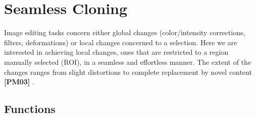 \hypertarget{group__photo__clone}{}\section{Seamless Cloning}
\label{group__photo__clone}


Image editing tasks concern either global changes (color/intensity corrections, filters, deformations) or local changes concerned to a selection. Here we are interested in achieving local changes, ones that are restricted to a region manually selected (R\+OI), in a seamless and effortless manner. The extent of the changes ranges from slight distortions to complete replacement by novel content {\bfseries [P\+M03]} .  


\subsection*{Functions}
